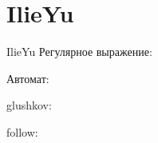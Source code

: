 \section{IlieYu}
\begin{frame}{IlieYu}
	Регулярное выражение:

	Автомат:


	glushkov:


	follow:


\end{frame}


